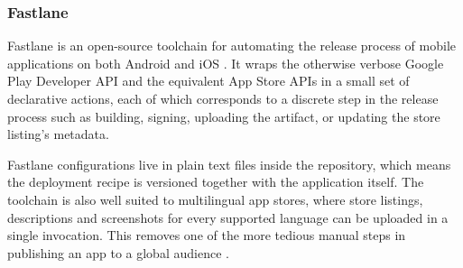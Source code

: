 \subsubsection{Fastlane}
Fastlane is an open-source toolchain for automating the release process of mobile applications on both Android and iOS \cite{b7, b8}. It wraps the otherwise verbose Google Play Developer API and the equivalent App Store APIs in a small set of declarative actions, each of which corresponds to a discrete step in the release process such as building, signing, uploading the artifact, or updating the store listing's metadata.

Fastlane configurations live in plain text files inside the repository, which means the deployment recipe is versioned together with the application itself. The toolchain is also well suited to multilingual app stores, where store listings, descriptions and screenshots for every supported language can be uploaded in a single invocation. This removes one of the more tedious manual steps in publishing an app to a global audience \cite{b7}.
